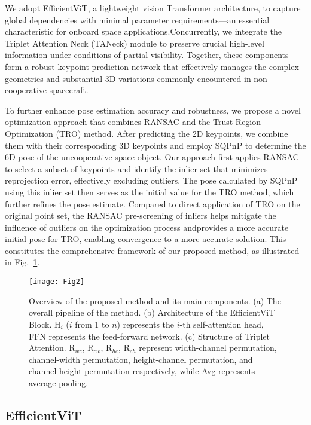 \documentclass[a4paper,fleqn]{cas-sc}
\begin{document}
We adopt EfficientViT, a lightweight vision Transformer architecture, to capture global dependencies with minimal parameter requirements—an essential characteristic for onboard space applications.Concurrently, we integrate the Triplet Attention Neck (TANeck) module to preserve crucial high-level information under conditions of partial visibility. Together, these components form a robust keypoint prediction network that effectively manages the complex geometries and substantial 3D variations commonly encountered in non-cooperative spacecraft.

To further enhance pose estimation accuracy and robustness, we propose a novel optimization approach that combines RANSAC and the Trust Region Optimization (TRO) \citep{coleman1996interior} method. After predicting the 2D keypoints, we combine them with their corresponding 3D keypoints and employ SQPnP \citep{terzakis2020consistently} to determine the 6D pose of the uncooperative space object. Our approach first applies RANSAC to select a subset of keypoints and identify the inlier set that minimizes reprojection error, effectively excluding outliers. The pose calculated by SQPnP using this inlier set then serves as the initial value for the TRO method, which further refines the pose estimate. Compared to direct application of TRO on the original point set, the RANSAC pre-screening of inliers helps mitigate the influence of outliers on the optimization process andprovides a more accurate initial pose for TRO, enabling convergence to a more accurate solution. This constitutes the comprehensive framework of our proposed method, as illustrated in Fig.~\ref{fig:method_overview}.

\begin{figure}[!htbp]
	\centering	
	\texttt{[image: Fig2]}
	\caption{Overview of the proposed method and its main components. (a) The overall pipeline of the method. (b) Architecture of the EfficientViT Block. H$_i$ ($i$ from 1 to $n$) represents the $i$-th self-attention head, FFN represents the feed-forward network. (c) Structure of Triplet Attention. R$_{wc}$, R$_{cw}$, R$_{hc}$, R$_{ch}$ represent width-channel permutation, channel-width permutation, height-channel permutation, and channel-height permutation respectively, while Avg represents average pooling.}
	\label{fig:method_overview}
\end{figure}

\subsection{EfficientViT}
\end{document}
